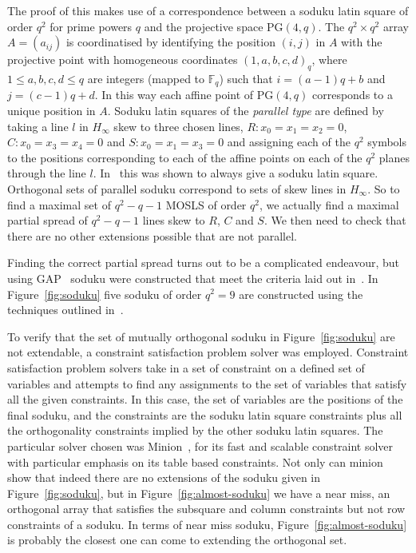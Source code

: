 \documentclass{article}
\newcommand{\PG}{\mathrm{PG}}
\begin{document}
The proof of this makes use of a correspondence between a soduku latin square of
order \(q^{2}\) for prime powers \(q\) and the projective space \(\PG (4, q)\).
The \(q^{2} \times q^{2}\) array \(A = (a_{ij})\) is coordinatised by identifying the
position \((i, j)\) in \(A\) with the projective point with homogeneous
coordinates \((1, a, b, c, d)_{q}\), where \(1 \leq a, b, c, d \leq q\) are integers
(mapped to \(\mathbb{F}_{q}\)) such that \(i = (a - 1)q + b\) and
\(j = (c - 1)q + d\). In this way each affine point of \(\PG (4, q)\)
corresponds to a unique position in \(A\). Soduku latin squares of the
\textit{parallel type} are defined by taking a line \(l\) in \(H_{\infty}\) skew to
three chosen lines, \(R : x_{0} = x_{1} = x_{2} = 0\),
\(C : x_{0} = x_{3} = x_{4} = 0\) and \(S : x_{0} = x_{1} = x_{3} = 0\) and
assigning each of the \(q^{2}\) symbols to the positions corresponding to each
of the affine points on each of the \(q^{2}\) planes through the line \(l\). In~\cite{Dhaeseleer2017} this was shown to always give a soduku latin square. Orthogonal sets
of parallel soduku correspond to sets of skew lines in \(H_{\infty}\). So to find a maximal
set of \(q^{2} - q - 1\) MOSLS of order \(q^{2}\), we actually find a maximal
partial spread of \(q^{2} - q - 1\) lines skew to \(R\), \(C\) and \(S\). We then need to check that there are no other extensions possible that are not parallel.

Finding the correct partial spread turns out to be a complicated endeavour, but
using GAP~\cite{GAP4} soduku were constructed that meet the criteria laid out
in~\cite{Dhaeseleer2017}. In Figure~\ref{fig:soduku} five soduku of order \(q^{2} = 9\) are constructed using the techniques outlined in~\cite{Dhaeseleer2017}.

To verify that the set of mutually orthogonal soduku in Figure~\ref{fig:soduku}
are not extendable, a constraint satisfaction problem solver was employed.
Constraint satisfaction problem solvers take in a set of constraint on a defined
set of variables and attempts to find any assignments to the set of variables
that satisfy all the given constraints. In this case, the set of variables are
the positions of the final soduku, and the constraints are the soduku latin
square constraints plus all the orthogonality constraints implied by the other
soduku latin squares. The particular solver chosen was Minion~\cite{minion06},
for its fast and scalable constraint solver with particular emphasis on its
table based constraints. Not only can minion show that indeed there are no
extensions of the soduku given in Figure~\ref{fig:soduku}, but in
Figure~\ref{fig:almost-soduku} we have a near miss, an orthogonal array that
satisfies the subsquare and column constraints but not row constraints of a
soduku. In terms of near miss soduku, Figure~\ref{fig:almost-soduku} is probably
the closest one can come to extending the orthogonal set.
\end{document}
